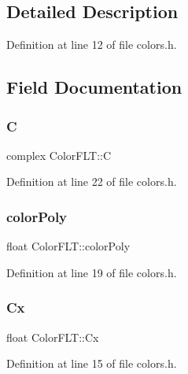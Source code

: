 \subsection{Detailed Description}


Definition at line 12 of file colors.\+h.



\subsection{Field Documentation}
\mbox{\label{struct_color_f_l_t_ad9f2932b326bd90c655bce9b24424efb}} 
\subsubsection{\texorpdfstring{C}{C}}
{\footnotesize\ttfamily complex Color\+F\+L\+T\+::C}



Definition at line 22 of file colors.\+h.

\mbox{\label{struct_color_f_l_t_a9ac4dfc637230f01cc278625e4c08f63}} 
\subsubsection{\texorpdfstring{color\+Poly}{colorPoly}}
{\footnotesize\ttfamily float Color\+F\+L\+T\+::color\+Poly}



Definition at line 19 of file colors.\+h.

\mbox{\label{struct_color_f_l_t_af4d84f668f31ebdd414ddb19d7e42f8a}} 
\subsubsection{\texorpdfstring{Cx}{Cx}}
{\footnotesize\ttfamily float Color\+F\+L\+T\+::\+Cx}



Definition at line 15 of file colors.\+h.

\mbox{\label{struct_color_f_l_t_a17d65d9420a8ed144559a9d3d591b680}} 
